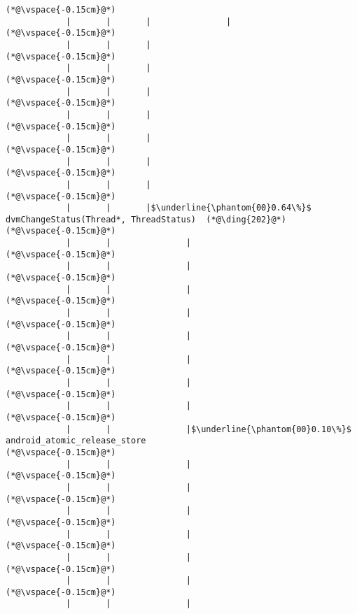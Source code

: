 \begin{lstlisting}[caption=20 viiteparametria Java$\to$C , label=profile:J2CBenchmark00206, numberbychapter=true, frame=lines, float, floatplacement=t]
(*@\vspace{-0.15cm}@*)
            |       |       |               |
(*@\vspace{-0.15cm}@*)
            |       |       |
(*@\vspace{-0.15cm}@*)
            |       |       |
(*@\vspace{-0.15cm}@*)
            |       |       |
(*@\vspace{-0.15cm}@*)
            |       |       |
(*@\vspace{-0.15cm}@*)
            |       |       |
(*@\vspace{-0.15cm}@*)
            |       |       |
(*@\vspace{-0.15cm}@*)
            |       |       |
(*@\vspace{-0.15cm}@*)
            |       |       |$\underline{\phantom{00}0.64\%}$ dvmChangeStatus(Thread*, ThreadStatus)  (*@\ding{202}@*)
(*@\vspace{-0.15cm}@*)
            |       |               |
(*@\vspace{-0.15cm}@*)
            |       |               |
(*@\vspace{-0.15cm}@*)
            |       |               |
(*@\vspace{-0.15cm}@*)
            |       |               |
(*@\vspace{-0.15cm}@*)
            |       |               |
(*@\vspace{-0.15cm}@*)
            |       |               |
(*@\vspace{-0.15cm}@*)
            |       |               |
(*@\vspace{-0.15cm}@*)
            |       |               |
(*@\vspace{-0.15cm}@*)
            |       |               |$\underline{\phantom{00}0.10\%}$ android_atomic_release_store
(*@\vspace{-0.15cm}@*)
            |       |               |
(*@\vspace{-0.15cm}@*)
            |       |               |
(*@\vspace{-0.15cm}@*)
            |       |               |
(*@\vspace{-0.15cm}@*)
            |       |               |
(*@\vspace{-0.15cm}@*)
            |       |               |
(*@\vspace{-0.15cm}@*)
            |       |               |
(*@\vspace{-0.15cm}@*)
            |       |               |

\end{lstlisting}
